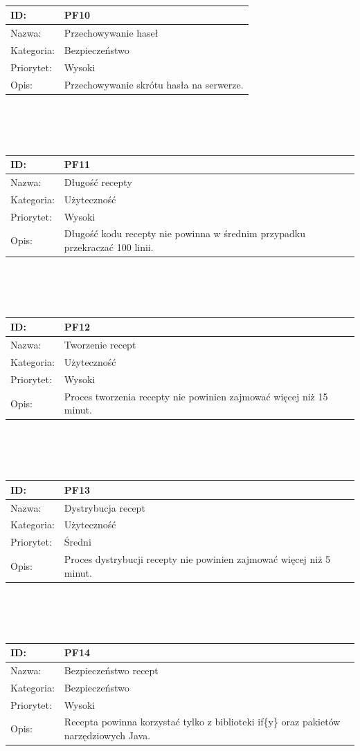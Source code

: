 \documentclass[11pt,a4paper,polish,thesis]{dcsbook}
\begin{document}
\begin{tabular}{|p{2cm}|p{12cm}|}
\\ \hline \end{tabular} \\\\\ \begin{tabular}{|p{2cm}|p{12cm}|}  \hline ID: &
PF10
\\ \hline Nazwa: &
Przechowywanie haseł
\\ \hline Kategoria: &
Bezpieczeństwo
\\ \hline Priorytet: &
Wysoki
\\ \hline Opis: &
Przechowywanie skrótu hasła na serwerze.
\\ \hline \end{tabular} \\\\\ \begin{tabular}{|p{2cm}|p{12cm}|}  \hline ID: &
PF11
\\ \hline Nazwa: &
Długość recepty
\\ \hline Kategoria: &
Użyteczność
\\ \hline Priorytet: &
Wysoki
\\ \hline Opis: &
Długość kodu recepty nie powinna w średnim przypadku przekraczać 100 linii.
\\ \hline \end{tabular} \\\\\ \begin{tabular}{|p{2cm}|p{12cm}|}  \hline ID: &
PF12
\\ \hline Nazwa: &
Tworzenie recept
\\ \hline Kategoria: &
Użyteczność
\\ \hline Priorytet: &
Wysoki
\\ \hline Opis: &
Proces tworzenia recepty nie powinien zajmować więcej niż 15 minut.
\\ \hline \end{tabular} \\\\\ \begin{tabular}{|p{2cm}|p{12cm}|}  \hline ID: &
PF13
\\ \hline Nazwa: &
Dystrybucja recept
\\ \hline Kategoria: &
Użyteczność
\\ \hline Priorytet: &
Średni
\\ \hline Opis: &
Proces dystrybucji recepty nie powinien zajmować więcej niż 5 minut.
\\ \hline \end{tabular} \\\\\ \begin{tabular}{|p{2cm}|p{12cm}|}  \hline ID: &
PF14
\\ \hline Nazwa: &
Bezpieczeństwo recept
\\ \hline Kategoria: &
Bezpieczeństwo
\\ \hline Priorytet: &
Wysoki
\\ \hline Opis: &
Recepta powinna korzystać tylko z biblioteki if\{y\} oraz pakietów narzędziowych Java.
\\ \hline \end{tabular}
\end{document}
